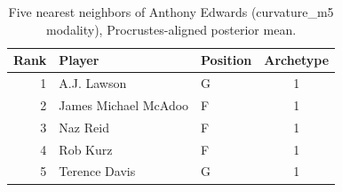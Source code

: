 \begin{table}[htbp]
  \centering\small
  \begin{tabular}{rllc}
    \toprule
    Rank & Player & Position & Archetype \\
    \midrule
    1 & A.J. Lawson & G & 1 \\
    2 & James Michael McAdoo & F & 1 \\
    3 & Naz Reid & F & 1 \\
    4 & Rob Kurz & F & 1 \\
    5 & Terence Davis & G & 1 \\
    \bottomrule
  \end{tabular}
  \caption{Five nearest neighbors of Anthony Edwards (curvature_m5 modality), Procrustes-aligned posterior mean.}
  \label{tab:Anthony_Edwards_neighbors_curvature_m5}
\end{table}

